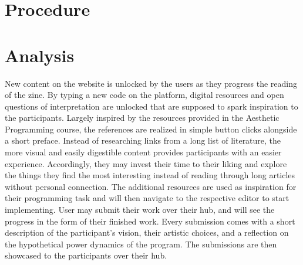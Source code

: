 \section{Procedure}
\section{Analysis}

New content on the website is unlocked by the users as they progress the reading of the zine. By typing a new code on the platform, digital resources and open questions of interpretation are unlocked that are supposed to spark inspiration to the participants. Largely inspired by the resources provided in the Aesthetic Programming course, the references are realized in simple button clicks alongside a short preface. Instead of researching links from a long list of literature, the more visual and easily digestible content provides participants with an easier experience. Accordingly, they may invest their time to their liking and explore the things they find the most interesting instead of reading through long articles without personal connection.
The additional resources are used as inspiration for their programming task and will then navigate to the respective editor to start implementing. User may submit their work over their hub, and will see the progress in the form of their finished work. Every submission comes with a short description of the participant’s vision, their artistic choices, and a reflection on the hypothetical power dynamics of the program. The submissions are then showcased to the participants over their hub.


